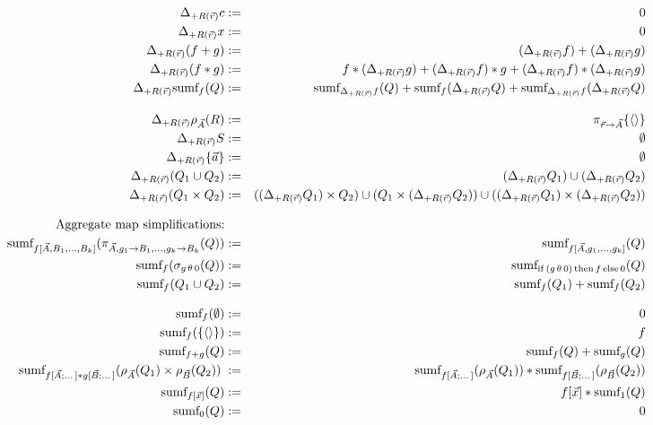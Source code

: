 \begin{figure*}[t!]
\begin{eqnarray}
\label{eq:a1}
\Delta_{+R(\vec{r})} c       &:=& 0 \\
\label{eq:a2}
\Delta_{+R(\vec{r})} x       &:=& 0 \\
\label{eq:a3}
\Delta_{+R(\vec{r})} (f + g) &:=& (\Delta_{+R(\vec{r})} f) + (\Delta_{+R(\vec{r})} g) \\
\label{eq:a4}
\Delta_{+R(\vec{r})} (f * g) &:=&         f                * (\Delta_{+R(\vec{r})} g)
                              +   (\Delta_{+R(\vec{r})} f) * g                        
                              +   (\Delta_{+R(\vec{r})} f) * (\Delta_{+R(\vec{r})} g)
\\
\label{eq:a5}
\Delta_{+R(\vec{r})} \algsumf_f(Q) &:=&
   \algsumf_{\Delta_{+R(\vec{r})} f}(Q)
   + \algsumf_f(\Delta_{+R(\vec{r})} Q)
   + \algsumf_{\Delta_{+R(\vec{r})} f}(\Delta_{+R(\vec{r})} Q)
\\[2ex]
\label{eq:b1}
\Delta_{+R(\vec{r})} \rho_{\vec{A}}(R) &:=& \pi_{\vec{r} \rightarrow \vec{A}}\{\tuple{}\}
\\
\label{eq:b2}
\Delta_{+R(\vec{r})} S &:=& \emptyset
\\
\label{eq:b3}
\Delta_{+R(\vec{r})} \{ \vec{a} \} &:=& \emptyset
\\
\label{eq:b4}
\Delta_{+R(\vec{r})} (Q_1 \cup Q_2) &:=&
(\Delta_{+R(\vec{r})} Q_1) \cup (\Delta_{+R(\vec{r})} Q_2)
\\
\label{eq:b5}
\Delta_{+R(\vec{r})} (Q_1 \times Q_2) &:=&
((\Delta_{+R(\vec{r})} Q_1) \times Q_2) \cup
(Q_1 \times (\Delta_{+R(\vec{r})} Q_2)) \cup
((\Delta_{+R(\vec{r})} Q_1) \times (\Delta_{+R(\vec{r})} Q_2))
\\[2ex]
%
%
\mbox{Aggregate map simplifications:} &&
\\
\label{eq:c1}
\algsumf_{f[\vec{A}, B_1, \dots, B_k]}
   (\pi_{\vec{A}, g_1 \rightarrow B_1, \dots, g_k \rightarrow B_k}(Q))
&:=&
\algsumf_{f[\vec{A}, g_1, \dots, g_k]}(Q)
\\
\label{eq:c2}
\algsumf_f(\sigma_{g \,\theta\, 0}(Q))
&:=&
\algsumf_{\mathrm{if} \, (g \,\theta\, 0) \, \mathrm{then} \, f \, \mathrm{else} \, 0}(Q)
\\
\label{eq:c3}
\algsumf_f(Q_1 \cup Q_2) &:=& \algsumf_f(Q_1) + \algsumf_f(Q_2)
\\[2ex]
%
%
\label{eq:d1}
\algsumf_f(\emptyset) &:=& 0
\\
\label{eq:d2}
\algsumf_f(\{\tuple{}\}) &:=& f
\\
\label{eq:d3}
\algsumf_{f+g}(Q) &:=& \algsumf_f(Q) + \algsumf_g(Q)
\\
\label{eq:d4}
\algsumf_{f[\vec{A};\dots] * g[\vec{B};\dots]}(\rho_{\vec{A}}(Q_1) \times \rho_{\vec{B}}(Q_2)) \; &:=&
\algsumf_{f[\vec{A};\dots]}(\rho_{\vec{A}}(Q_1))
    * \algsumf_{f[\vec{B};\dots]}(\rho_{\vec{B}}(Q_2))
\\
\label{eq:d5}
\algsumf_{f[\vec{x}]}(Q) &:=& f[\vec{x}] * \algsumf_1(Q)
\\
\label{eq:d6}
\algsumf_{0}(Q) &:=& 0
\end{eqnarray}


\end{figure*}
